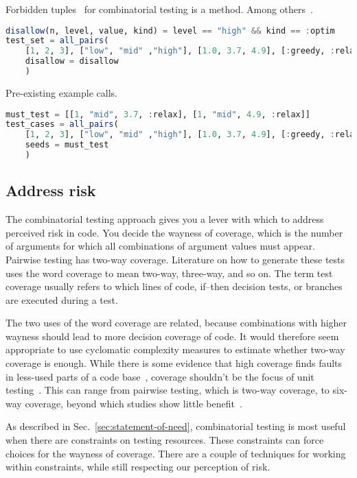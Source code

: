 \documentclass{juliacon}
\begin{document}
\vskip 6pt
Forbidden tuples~\cite{Petke2015-ex} for combinatorial testing is a method. Among others~\cite{Grindal2006-vy}.
\begin{lstlisting}[language=Julia]
disallow(n, level, value, kind) = level == "high" && kind == :optim
test_set = all_pairs(
    [1, 2, 3], ["low", "mid" ,"high"], [1.0, 3.7, 4.9], [:greedy, :relax, :optim];
    disallow = disallow
    )
\end{lstlisting}

\vskip 6pt
Pre-existing example calls.
\begin{lstlisting}[language=Julia]
must_test = [[1, "mid", 3.7, :relax], [1, "mid", 4.9, :relax]]
test_cases = all_pairs(
    [1, 2, 3], ["low", "mid" ,"high"], [1.0, 3.7, 4.9], [:greedy, :relax, :optim];
    seeds = must_test
    )
\end{lstlisting}

\subsection{Address risk}

The combinatorial testing approach gives you a lever with which to address perceived risk in code. You decide the wayness of coverage, which is the number of arguments for which all combinations of argument values must appear. Pairwise testing has two-way coverage. Literature on how to generate these tests uses the word coverage to mean two-way, three-way, and so on. The term test coverage usually refers to which lines of code, if--then decision tests, or branches are executed during a test.

\vskip 6pt
The two uses of the word coverage are related, because combinations with higher wayness should lead to more decision coverage of code. It would therefore seem appropriate to use cyclomatic complexity measures to estimate whether two-way coverage is enough. While there is some evidence that high coverage finds faults in less-used parts of a code base~\cite{Cai2005-ex}, coverage shouldn't be the focus of unit testing~\cite{Inozemtseva2014-gz}. This can range from pairwise testing, which is two-way coverage, to six-way coverage, beyond which studies show little benefit~\cite{Petke2015-ex}.

\vskip 6pt
As described in Sec.~\ref{sec:statement-of-need}, combinatorial testing is most useful when there are constraints on testing resources. These constraints can force choices for the wayness of coverage. There are a couple of techniques for working within constraints, while still respecting our perception of risk.
\end{document}
